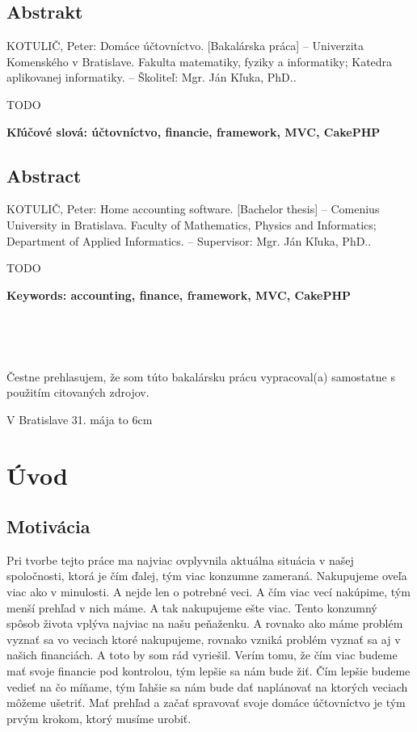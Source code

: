 \documentclass[12pt,oneside]{book}
\def\mftitle{Domáce účtovníctvo}
\def\mfthesistype{Bakalárska práca}
\begin{document}
\eject


\section*{Abstrakt}
KOTULIČ, Peter: \mftitle. [\mfthesistype] – Univerzita Komenského v Bratislave. Fakulta matematiky, fyziky a informatiky; Katedra aplikovanej informatiky. – Školiteľ: Mgr. Ján Kľuka, PhD.. 

TODO

{\bf Kľúčové slová: účtovníctvo, financie, framework, MVC, CakePHP}

\section*{Abstract}
KOTULIČ, Peter: Home accounting software. [Bachelor thesis] – Comenius University in Bratislava. Faculty of Mathematics, Physics and Informatics; Department of Applied Informatics. – Supervisor: Mgr. Ján Kľuka, PhD.. 

TODO

{\bf Keywords: accounting, finance, framework, MVC, CakePHP}

\eject

{~}\vspace{12cm}

\noindent
\begin{minipage}{0.25\textwidth}~\end{minipage}
\begin{minipage}{0.68\textwidth}
Čestne prehlasujem, že som túto bakalársku prácu vypracoval(a) samostatne s použitím citovaných zdrojov.

\bigskip\bigskip

V Bratislave 31. mája \hfill\hbox to 6cm{\dotfill}
\end{minipage}
\vfill\eject

\tableofcontents

\newpage


\mainmatter

\chapter{Úvod}\label{chap:intro}

\section{Motivácia}
Pri tvorbe tejto práce ma najviac ovplyvnila aktuálna situácia v našej spoločnosti, ktorá je čím ďalej, tým viac konzumne zameraná. Nakupujeme oveľa viac ako v minulosti. A nejde len o potrebné veci. A čím viac vecí nakúpime, tým menší prehľad v nich máme. A tak nakupujeme ešte viac. Tento konzumný spôsob života vplýva najviac na našu peňaženku. A rovnako ako máme problém vyznať sa vo veciach ktoré nakupujeme, rovnako vzniká problém vyznať sa aj v našich financiách. A toto by som rád vyriešil. Verím tomu, že čím viac budeme mať svoje financie pod kontrolou, tým lepšie sa nám bude žiť. Čím lepšie budeme vedieť na čo míňame, tým ľahšie sa nám bude dať naplánovať na ktorých veciach môžeme ušetriť. Mať prehľad a začať spravovať svoje domáce účtovníctvo je tým prvým krokom, ktorý musíme urobiť.
\end{document}
